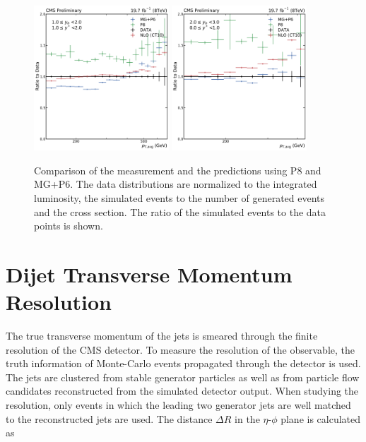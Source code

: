 \begin{figure}[htbp]
    \includegraphics[width=0.45\textwidth]{figures/measurement/ratio_reco_to_data_yb1ys1.pdf}\hfill
    \includegraphics[width=0.45\textwidth]{figures/measurement/ratio_reco_to_data_yb2ys0.pdf}
    \caption{Comparison of the measurement and the predictions using P8 and MG+P6. The data distributions are normalized
    to the integrated luminosity, the simulated events to the number of generated events and the cross section. The ratio of the simulated
    events to the data points is shown.}
    \label{fig:ratio_recotodata}
\end{figure}



\section{Dijet Transverse Momentum  Resolution}
\label{sec:resolution}

The true transverse momentum of the jets is smeared through the finite
resolution of the CMS detector. To measure the resolution of the \ptavg
observable, the truth information of Monte-Carlo events propagated through the
detector is used. The jets are clustered from stable generator particles as well
as from particle flow candidates reconstructed from the simulated detector
output. When studying the resolution, only events in which the leading two
generator jets are well matched to the reconstructed jets are used. The distance
$\Delta R$ in the $\eta$-$\phi$ plane is calculated as

